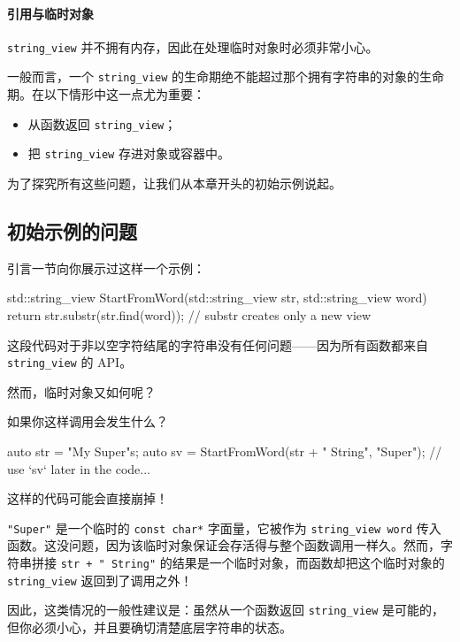 \paragraph{引用与临时对象}

\texttt{string\_view} 并不拥有内存，因此在处理临时对象时必须非常小心。

一般而言，一个 \texttt{string\_view} 的生命期绝不能超过那个拥有字符串的对象的生命期。在以下情形中这一点尤为重要：

\begin{itemize}
\item 从函数返回 \texttt{string\_view}；
\item 把 \texttt{string\_view} 存进对象或容器中。
\end{itemize}

为了探究所有这些问题，让我们从本章开头的初始示例说起。

\subsection{初始示例的问题}

引言一节向你展示过这样一个示例：

\begin{codebox}[cpp]
std::string_view StartFromWord(std::string_view str, std::string_view word)
{
return str.substr(str.find(word)); // substr creates only a new view
}
\end{codebox}

这段代码对于非以空字符结尾的字符串没有任何问题——因为所有函数都来自 \texttt{string\_view} 的 API。

然而，临时对象又如何呢？

如果你这样调用会发生什么？

\begin{codebox}[cpp]
auto str = "My Super"s;
auto sv = StartFromWord(str + " String", "Super");
// use `sv` later in the code...
\end{codebox}

这样的代码可能会直接崩掉！

\texttt{"Super"} 是一个临时的 \texttt{const char*} 字面量，它被作为 \texttt{string\_view word} 传入函数。这没问题，因为该临时对象保证会存活得与整个函数调用一样久。然而，字符串拼接 \texttt{str + " String"} 的结果是一个临时对象，而函数却把这个临时对象的 \texttt{string\_view} 返回到了调用之外！

因此，这类情况的一般性建议是：虽然从一个函数返回 \texttt{string\_view} 是可能的，但你必须小心，并且要确切清楚底层字符串的状态。

